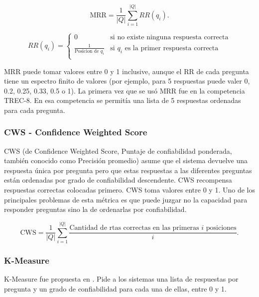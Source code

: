 \begin{equation}\label{eq:mrr}
 \text{MRR} = \frac{1}{|Q|} \sum_{i=1}^{|Q|} RR(q_i). \!
\end{equation}

\begin{equation*}
    RR(q_i) = \begin{cases}
               0     & \text{si no existe ninguna respuesta correcta}\\
               \frac{1}{\text{Posicion de }q_i} & \text{si }q_i\text{ es la primer respuesta correcta}\\
           \end{cases}
\end{equation*}

MRR puede tomar valores entre 0 y 1 inclusive, aunque el RR de cada pregunta tiene un espectro finito de valores (por ejemplo, para 5 respuestas puede valer 0, 0.2, 0.25, 0.33, 0.5 o 1). La primera vez que se usó MRR fue en la competencia TREC-8. En esa competencia se permitía una lista de 5 respuestas ordenadas para cada pregunta.  


\subsubsection*{CWS - Confidence Weighted Score}
CWS (de Confidence Weighted Score, Puntaje de confiabilidad ponderada, también conocido como Precisión promedio) asume que el sistema devuelve una respuesta única por pregunta pero que estas respuestas a las diferentes preguntas están ordenadas por grado de confiabilidad descendente. 
CWS recompensa respuestas correctas colocadas primero. CWS toma valores entre 0 y 1.  Uno de los principales problemas de esta métrica es que puede juzgar no la capacidad para responder preguntas sino la de ordenarlas por confiabilidad.

\begin{equation}\label{eq:cws}
 \text{CWS} = \frac{1}{|Q|} \sum_{i=1}^{|Q|} \frac{\text{Cantidad de rtas correctas en las primeras $i$ posiciones}}{i}. \!
\end{equation}

 
\subsubsection*{K-Measure}
K-Measure fue propuesta en \cite{CLEF04}. Pide a los sistemas una lista de respuestas por pregunta y un grado de confiabilidad para cada una de ellas, entre 0 y 1. 

